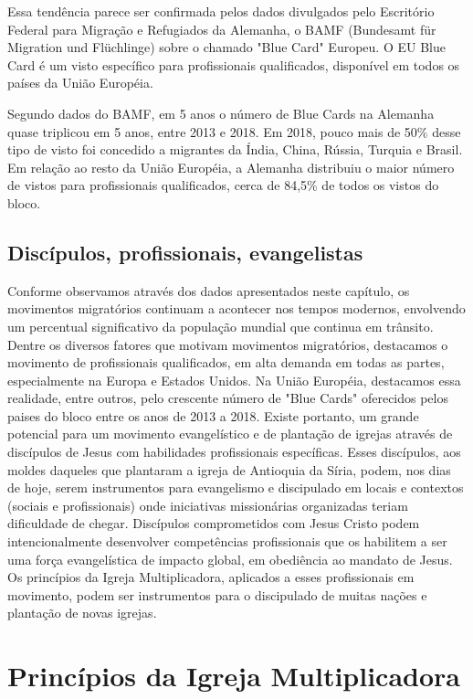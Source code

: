 \documentclass[
	12pt,				%
	openright,			%
	twoside,			%
	a4paper,			%
	english,			%
	french,				%
	spanish,			%
	brazil				%
	]{abntex2}
\begin{document}
Essa tendência parece ser confirmada pelos dados divulgados pelo Escritório Federal para Migração e Refugiados da Alemanha, o BAMF (Bundesamt für Migration und Flüchlinge) sobre o chamado "Blue Card" Europeu. O EU Blue Card é um visto específico para profissionais qualificados, disponível em todos os países da União Européia.

Segundo dados do BAMF, em 5 anos o número de Blue Cards na Alemanha quase triplicou em 5 anos, entre 2013 e 2018. Em 2018, pouco mais de 50\% desse tipo de visto foi concedido a migrantes da Índia, China, Rússia, Turquia e Brasil. Em relação ao resto da União Européia, a Alemanha distribuiu o maior número de vistos para profissionais qualificados, cerca de 84,5\% de todos os vistos do bloco\cite{bamf}.

\section{Discípulos, profissionais, evangelistas}

Conforme observamos através dos dados apresentados neste capítulo, os movimentos migratórios continuam a acontecer nos tempos modernos, envolvendo um percentual significativo da população mundial que continua em trânsito. Dentre os diversos fatores que motivam movimentos migratórios, destacamos o movimento de profissionais qualificados, em alta demanda em todas as partes, especialmente na Europa e Estados Unidos. Na União Européia, destacamos essa realidade, entre outros, pelo crescente número de "Blue Cards" oferecidos pelos paises do bloco entre os anos de 2013 a 2018. Existe portanto, um grande potencial para um movimento evangelístico e de plantação de igrejas através de discípulos de Jesus com habilidades profissionais específicas. Esses discípulos, aos moldes daqueles que plantaram a igreja de Antioquia da Síria, podem, nos dias de hoje, serem instrumentos para evangelismo e discipulado em locais e contextos (sociais e profissionais) onde iniciativas missionárias organizadas teriam dificuldade de chegar. Discípulos comprometidos com Jesus Cristo podem intencionalmente desenvolver competências profissionais que os habilitem a ser uma força evangelística de impacto global, em obediência ao mandato de Jesus. Os princípios da Igreja Multiplicadora, aplicados a esses profissionais em movimento, podem ser instrumentos para o discipulado de muitas nações e plantação de novas igrejas.

\chapter{Princípios da Igreja Multiplicadora}
\end{document}
